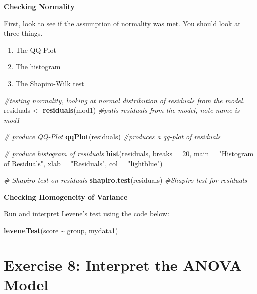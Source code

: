 \documentclass[
]{book}
\newenvironment{Shaded}{\begin{snugshade}}{\end{snugshade}}
\newcommand{\AttributeTok}[1]{\textcolor[rgb]{0.13,0.29,0.53}{#1}}
\newcommand{\CommentTok}[1]{\textcolor[rgb]{0.56,0.35,0.01}{\textit{#1}}}
\newcommand{\DecValTok}[1]{\textcolor[rgb]{0.00,0.00,0.81}{#1}}
\newcommand{\FunctionTok}[1]{\textcolor[rgb]{0.13,0.29,0.53}{\textbf{#1}}}
\newcommand{\NormalTok}[1]{#1}
\newcommand{\OtherTok}[1]{\textcolor[rgb]{0.56,0.35,0.01}{#1}}
\newcommand{\SpecialCharTok}[1]{\textcolor[rgb]{0.81,0.36,0.00}{\textbf{#1}}}
\newcommand{\StringTok}[1]{\textcolor[rgb]{0.31,0.60,0.02}{#1}}
\providecommand{\tightlist}{%
  \setlength{\itemsep}{0pt}\setlength{\parskip}{0pt}}
\let\oldsection\section
\renewcommand{\section}{\needspace{5\baselineskip}\oldsection}
\begin{document}
\textbf{Checking Normality}

First, look to see if the assumption of normality was met. You should look at three things.

\begin{enumerate}
\def\labelenumi{\arabic{enumi})}
\tightlist
\item
  The QQ-Plot
\item
  The histogram
\item
  The Shapiro-Wilk test
\end{enumerate}

\begin{Shaded}
\begin{Highlighting}[]
\CommentTok{\#testing normality, looking at normal distribution of residuals from the model.}
\NormalTok{residuals }\OtherTok{\textless{}{-}} \FunctionTok{residuals}\NormalTok{(mod1) }\CommentTok{\#pulls residuals from the model, note name is \textasciigrave{}mod1\textasciigrave{}}

\CommentTok{\# produce QQ{-}Plot}
\FunctionTok{qqPlot}\NormalTok{(residuals) }\CommentTok{\#produces a qq{-}plot of residuals}

\CommentTok{\# produce histogram of residuals}
\FunctionTok{hist}\NormalTok{(residuals, }\AttributeTok{breaks =} \DecValTok{20}\NormalTok{, }\AttributeTok{main =} \StringTok{"Histogram of Residuals"}\NormalTok{, }\AttributeTok{xlab =} \StringTok{"Residuals"}\NormalTok{, }\AttributeTok{col =} \StringTok{"lightblue"}\NormalTok{) }

\CommentTok{\# Shapiro test on residuals}
\FunctionTok{shapiro.test}\NormalTok{(residuals) }\CommentTok{\#Shapiro test for residuals}
\end{Highlighting}
\end{Shaded}

\textbf{Checking Homogeneity of Variance}

Run and interpret Levene's test using the code below:

\begin{Shaded}
\begin{Highlighting}[]
\FunctionTok{leveneTest}\NormalTok{(score }\SpecialCharTok{\textasciitilde{}}\NormalTok{ group, mydata1)}
\end{Highlighting}
\end{Shaded}

\section{Exercise 8: Interpret the ANOVA Model}\label{exercise-8-interpret-the-anova-model}
\end{document}
